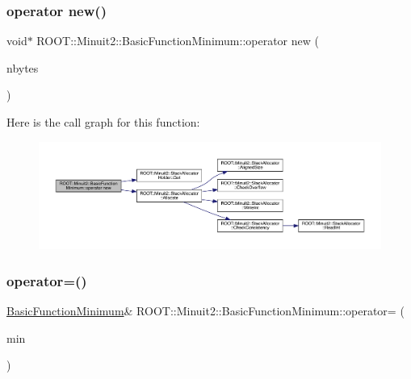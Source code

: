\subsubsection{\texorpdfstring{operator new()}{operator new()}\hspace{0.1cm}{\footnotesize\ttfamily [3/3]}}
{\footnotesize\ttfamily void$\ast$ R\+O\+O\+T\+::\+Minuit2\+::\+Basic\+Function\+Minimum\+::operator new (\begin{DoxyParamCaption}\item[{size\+\_\+t}]{nbytes }\end{DoxyParamCaption})\hspace{0.3cm}{\ttfamily [inline]}}

Here is the call graph for this function\+:
\nopagebreak
\begin{figure}[H]
\begin{center}
\leavevmode
\includegraphics[width=350pt]{de/d25/classROOT_1_1Minuit2_1_1BasicFunctionMinimum_a49a32bdb3ff21202fcfa9a9e42015b8f_cgraph}
\end{center}
\end{figure}
\mbox{\label{classROOT_1_1Minuit2_1_1BasicFunctionMinimum_ad143c1c314e041649151bac9bb9e7a91}} 
\subsubsection{\texorpdfstring{operator=()}{operator=()}\hspace{0.1cm}{\footnotesize\ttfamily [1/3]}}
{\footnotesize\ttfamily \mbox{\hyperlink{classROOT_1_1Minuit2_1_1BasicFunctionMinimum}{Basic\+Function\+Minimum}}\& R\+O\+O\+T\+::\+Minuit2\+::\+Basic\+Function\+Minimum\+::operator= (\begin{DoxyParamCaption}\item[{const \mbox{\hyperlink{classROOT_1_1Minuit2_1_1BasicFunctionMinimum}{Basic\+Function\+Minimum}} \&}]{min }\end{DoxyParamCaption})\hspace{0.3cm}{\ttfamily [inline]}}

